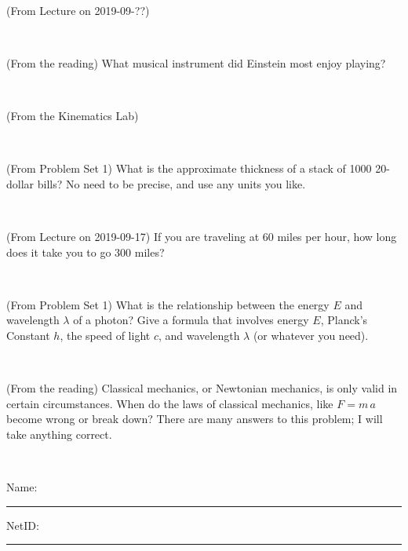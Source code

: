 \documentclass[12pt, letterpaper]{article}
\begin{document}
\vfill ~

\begin{problem} (From Lecture on 2019-09-??)
\end{problem}


\vfill ~

\begin{problem} (From the reading)
What musical instrument did Einstein most enjoy playing?
\end{problem}


\vfill ~

\begin{problem} (From the Kinematics Lab)

\end{problem}


\vfill ~


\clearpage


\begin{problem} (From Problem Set 1)
What is the approximate thickness of a stack of 1000 20-dollar bills?
No need to be precise, and use any units you like.
\end{problem}


\vfill ~

\begin{problem} (From Lecture on 2019-09-17)
If you are traveling at 60 miles per hour, how long does
it take you to go 300 miles?
\end{problem}


\vfill ~

\begin{problem} (From Problem Set 1)
What is the relationship between the energy $E$ and wavelength
$\lambda$ of a photon? Give a formula that involves energy $E$,
Planck's Constant $h$, the speed of light $c$, and wavelength
$\lambda$ (or whatever you need).
\end{problem}

\vfill ~

\begin{problem} (From the reading)
Classical mechanics, or Newtonian mechanics, is only valid in certain
circumstances. When do the laws of classical mechanics, like $F =
m\,a$ become wrong or break down? There are many answers to this
problem; I will take anything correct.
\end{problem}


\vfill ~


\cleardoublepage



\noindent
Name: \rule[-1ex]{0.60\textwidth}{0.1pt}
NetID: \rule[-1ex]{0.20\textwidth}{0.1pt}
\end{document}
